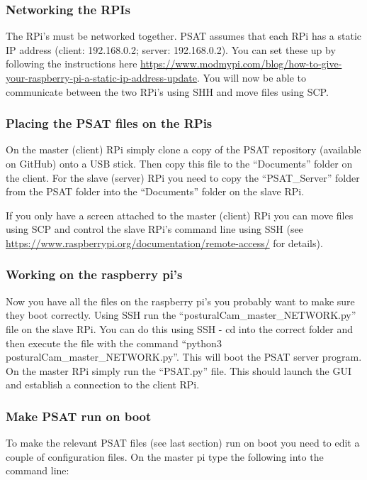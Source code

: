 \documentclass[12pt,a4paper]{report}
\begin{document}
		\subsubsection{Networking the RPIs}
		The RPi's must be networked together. PSAT assumes that each RPi has a static IP address (client: 192.168.0.2; server: 192.168.0.2). You can set these up by following the instructions here \url{https://www.modmypi.com/blog/how-to-give-your-raspberry-pi-a-static-ip-address-update}. You will now be able to communicate between the two RPi's using SHH and move files using SCP. 
		
		
		\subsubsection{Placing the PSAT files on the RPis}
		On the master (client) RPi simply clone a copy of the PSAT repository (available on GitHub) onto a USB stick. Then copy this file to the ``Documents'' folder on the client. For the slave (server) RPi you need to copy the ``PSAT\_Server'' folder from the PSAT folder into the ``Documents'' folder on the slave RPi.
		
		If you only have a screen attached to the master (client) RPi you can move files using SCP and control the slave RPi's command line using SSH (see \url{ https://www.raspberrypi.org/documentation/remote-access/} for details).
		
		\subsubsection{Working on the raspberry pi's}
		Now you have all the files on the raspberry pi's you probably want to make sure they boot correctly. Using SSH run the ``posturalCam\_master\_NETWORK.py'' file on the slave RPi. You can do this using SSH - cd into the correct folder and then execute the file with the command ``python3 posturalCam\_master\_NETWORK.py''. This will boot the PSAT server program. On the master RPi simply run the ``PSAT.py'' file. This should launch the GUI and establish a connection to the client RPi.
		
		\subsubsection{Make PSAT run on boot}
		To make the relevant PSAT files (see last section) run on boot you need to edit a couple of configuration files. On the master pi type the following into the command line:
		
\end{document}
